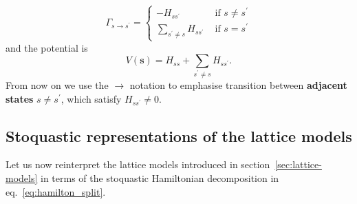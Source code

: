 \begin{equation}
\Gamma_{s \rightarrow s^{\prime}}=\left\{\begin{array}{ll}
-H_{s s^{\prime}} & \text { if } s \neq s^\prime \\
\sum_{s^{\prime} \neq s} H_{s s^{\prime}} & \text { if } s=s^{\prime}
\end{array}\right.
\end{equation}
and the potential is
\begin{equation}
V(\boldsymbol{s})=H_{s s}+\sum_{s^{\prime} \neq s} H_{s s^{\prime}}.
\end{equation}
From now on we use the $\rightarrow$ notation to emphasise transition between \textbf{adjacent states} $s\neq s^\prime$, which satisfy $H_{s s^{\prime}} \neq 0$. 

\subsection{Stoquastic representations of the lattice models}
\label{subsec:stoq_latt_forms}
Let us now reinterpret the lattice models introduced in section~\ref{sec:lattice-models} in terms of the stoquastic Hamiltonian decomposition in eq.~\eqref{eq:hamilton_split}.

